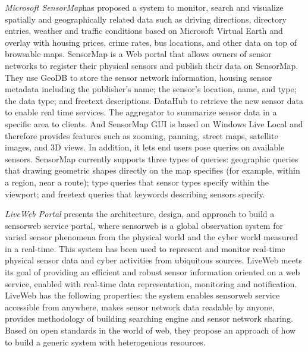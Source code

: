 	\emph{Microsoft SensorMap\cite{10.1109/MC.2007.250}}has proposed a system to monitor, search and visualize spatially and geographically related data such as driving directions, directory entries, weather and traffic conditions based on Microsoft Virtual Earth and overlay with housing prices, crime rates, bus locations, and other data on top of browsable maps. SensorMap is a Web portal that allows owners of sensor networks to register their physical sensors and publish their data on SensorMap. They use GeoDB to store the sensor network information, housing sensor metadata including the publisher's name; the sensor's location, name, and type; the data type; and freetext descriptions. DataHub to retrieve the new sensor data to enable real time services. The aggregator to summarize sensor data in a specific area to clients. And SensorMap GUI is based on Windows Live Local and therefore provides features such as zooming, panning, street maps, satellite images, and 3D views. In addition, it lets end users pose queries on available sensors. SensorMap currently supports three types of queries: geographic queries that drawing geometric shapes directly on the map specifies (for example, within a region, near a route); type queries that sensor types specify within the viewport; and freetext queries that keywords describing sensors specify.

	 \emph{LiveWeb Portal}\cite{yang2011liveweb} presents the architecture, design, and approach to build a sensorweb service portal, where sensorweb is a global observation system for varied sensor phenomena from the physical world and the cyber world measured in a real-time. This system has been used to represent and monitor real-time physical sensor data and cyber activities from ubiquitous sources. LiveWeb meets its goal of providing an efficient and robust sensor information oriented on a web service, enabled with real-time data representation, monitoring and notification. LiveWeb has the following properties: the system enables sensorweb service accessible from anywhere, makes sensor network data readable by anyone, provides methodology of building searching engine and sensor network sharing. Based on open standards in the world of web, they propose an approach of how to build a generic system with heterogenious resources.

